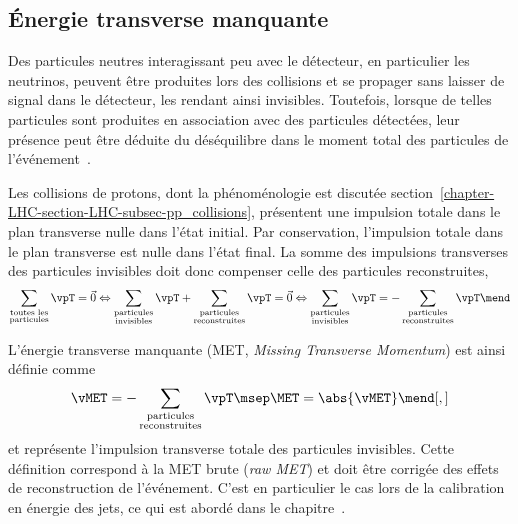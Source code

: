 \subsection{Énergie transverse manquante}\label{chapter-LHC-section-evt_reco-subsec-MET}
Des particules neutres interagissant peu avec le détecteur, en particulier les neutrinos, peuvent être produites lors des collisions et se propager sans laisser de signal dans le détecteur, les rendant ainsi invisibles.
Toutefois, lorsque de telles particules sont produites en association avec des particules détectées, leur présence peut être déduite du déséquilibre dans le moment total des particules de l'événement~\cite{CMS-PAS-JME-17-001}.
\par Les collisions de protons, dont la phénoménologie est discutée section~\ref{chapter-LHC-section-LHC-subsec-pp_collisions}, présentent une impulsion totale dans le plan transverse nulle dans l'état initial.
Par conservation, l'impulsion totale dans le plan transverse est nulle dans l'état final.
La somme des impulsions transverses des particules invisibles doit donc compenser celle des particules reconstruites, \ie
\begin{equation}
\sum_{\substack{\text{toutes les}\\\text{particules}}} \vpT = \vec{0}
\Leftrightarrow
\sum_{\substack{\text{particules}\\\text{invisibles}}} \vpT + \sum_{\substack{\text{particules}\\\text{reconstruites}}} \vpT = \vec{0}
\Leftrightarrow
\sum_{\substack{\text{particules}\\\text{invisibles}}} \vpT = -\sum_{\substack{\text{particules}\\\text{reconstruites}}} \vpT \mend
\end{equation}
\par L'énergie transverse manquante (MET, \emph{Missing Transverse Momentum}) est ainsi définie comme
\begin{equation}
\vMET = -\sum_{\substack{\text{particules}\\\text{reconstruites}}} \vpT
\msep
\MET = \abs{\vMET}
\mend[,]
\end{equation}
et représente l'impulsion transverse totale des particules invisibles.
Cette définition correspond à la MET \og brute \fg{} (\emph{raw MET}) et doit être corrigée des effets de reconstruction de l'événement.
C'est en particulier le cas lors de la calibration en énergie des jets, ce qui est abordé dans le chapitre~.
